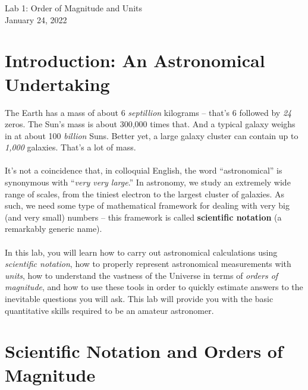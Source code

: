\documentclass[11pt]{article}
\begin{document}
\begin{center}
\huge{Lab 1: Order of Magnitude and Units}\\ \medskip \Large{January 24, 2022}
\end{center}


\section{Introduction: An Astronomical Undertaking}

The Earth has a mass of about 6 \emph{septillion} kilograms -- that's 6 followed by \emph{24} zeros. The Sun's mass is about 300,000 times that. And a typical galaxy weighs in at about 100 \emph{billion} Suns. Better yet, a large galaxy cluster can contain up to \emph{1,000} galaxies. That's a lot of mass.
\\ \\ \noindent
It's not a coincidence that, in colloquial English, the word ``astronomical'' is synonymous with ``\emph{very very large}.'' In astronomy, we study an extremely wide range of scales, from the tiniest electron to the largest cluster of galaxies. As such, we need some type of mathematical framework for dealing with very big (and very small) numbers -- this framework is called \textbf{scientific notation} (a remarkably generic name). 
\\ \\ \noindent
In this lab, you will learn how to carry out astronomical calculations using \emph{scientific notation}, how to properly represent astronomical measurements with \emph{units}, how to understand the vastness of the Universe in terms of \emph{orders of magnitude}, and how to use these tools in order to quickly estimate answers to the inevitable questions you will ask. This lab will provide you with the basic quantitative skills required to be an amateur astronomer.

\section{Scientific Notation and Orders of Magnitude}
\end{document}
